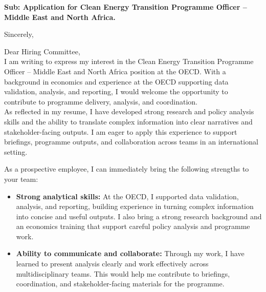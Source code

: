 \documentclass[11pt,a4paper,roman]{moderncv}
\begin{document}
\date{\today}
\opening{\textbf{Sub: Application for Clean Energy Transition Programme Officer – Middle East and North Africa.}}
\closing{Sincerely, \vspace{-1em}}


\makelettertitle



Dear Hiring Committee,
\\
\vspace{1em}
I am writing to express my interest in the Clean Energy Transition Programme Officer – Middle East and North Africa position at the OECD. With a background in economics and experience at the OECD supporting data validation, analysis, and reporting, I would welcome the opportunity to contribute to programme delivery, analysis, and coordination.\\

\vspace{1em}
As reflected in my resume, I have developed strong research and policy analysis skills and the ability to translate complex information into clear narratives and stakeholder-facing outputs. I am eager to apply this experience to support briefings, programme outputs, and collaboration across teams in an international setting.\\
\vspace{1em}

As a prospective employee, I can immediately bring the following strengths to your team:
\vspace{0.5em}
\begin{itemize}
\item \textbf{Strong analytical skills:} At the OECD, I supported data validation, analysis, and reporting, building experience in turning complex information into concise and useful outputs. I also bring a strong research background and an economics training that support careful policy analysis and programme work.
\item \textbf{Ability to communicate and collaborate:} Through my work, I have learned to present analysis clearly and work effectively across multidisciplinary teams. This would help me contribute to briefings, coordination, and stakeholder-facing materials for the programme.
\end{itemize}
\end{document}
